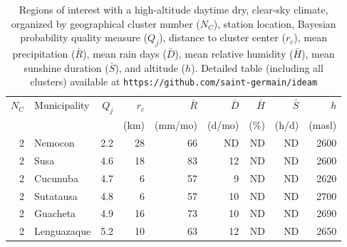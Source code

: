 \documentclass[12pt]{iopart}
\begin{document}
\begin{table}
\caption{\label{tabfin}Regions of interest with a high-altitude daytime dry, clear-sky climate, organized by geographical cluster number ($N_C$), station location, Bayesian probability quality measure ($Q_j$), distance to cluster center ($r_c$), mean precipitation  ($\bar{R}$), mean rain days ($\bar{D}$), mean relative humidity  ($\bar{H}$), mean sunshine duration  ($\bar{S}$), and altitude ($h$). Detailed table (including all clusters) available at \texttt{https://github.com/saint-germain/ideam} \\}

\begin{tabular}{rlrrrrrrr}
\toprule
 $N_C$  &                 Municipality  &  $Q_j$ &  $r_c$  &   $\bar{R}$ &   $\bar{D}$  &   $\bar{H}$  &  $\bar{S}$ &  $h$ \\
 &                   &    &    (km) &   (mm/mo) &  (d/mo) &   (\%) &   (h/d) &  (masl) \\
\midrule
              2 &                      Nemocon &            2.2 &                        28 &                        66 &                   ND &                        ND &                          ND &    2600 \\
              2 &                         Susa &            4.6 &                        18 &                        83 &                   12 &                        ND &                          ND &    2600 \\
              2 &                     Cucunuba &            4.7 &                         6 &                        57 &                    9 &                        ND &                          ND &    2620 \\
              2 &                    Sutatausa &            4.8 &                         6 &                        57 &                   10 &                        ND &                          ND &    2700 \\
              2 &                     Guacheta &            4.9 &                        16 &                        73 &                   10 &                        ND &                          ND &    2690 \\
              2 &                  Lenguazaque &            5.2 &                        10 &                        63 &                   12 &                        ND &                          ND &    2650 \\

\end{tabular}
\end{table}
\end{document}

